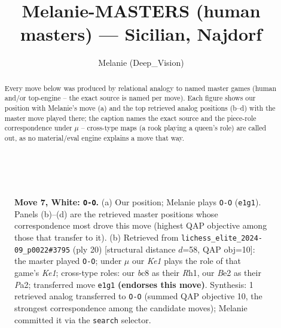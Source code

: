 \documentclass[11pt]{article}
\title{Melanie-MASTERS (human masters) — Sicilian, Najdorf}
\author{Melanie (Deep\_Vision)}
\date{}
\begin{document}
\maketitle

\begin{abstract}Every move below was produced by relational analogy to named master games (human and/or top-engine -- the exact source is named per move). Each figure shows our position with Melanie's move (a) and the top retrieved analog positions (b--d) with the master move played there; the caption names the exact source and the piece-role correspondence under $\mu$ -- cross-type maps (a rook playing a queen's role) are called out, as no material/eval engine explains a move that way.\end{abstract}

\begin{figure}[p]\centering
\begin{subfigure}{0.46\textwidth}\centering
\resizebox{\linewidth}{!}{%
\newchessgame
\chessboard[
  setfen={rnbqkb1r/1p3ppp/p2p1n2/4p3/3NP3/2N5/PPP1BPPP/R1BQK2R w KQkq - 0 7},
  showmover=false,
  pgfstyle=straightmove, color=movearrow, markmove={e1-g1}
]}
\caption{}
\end{subfigure}\hfill
\begin{subfigure}{0.46\textwidth}\centering
\resizebox{\linewidth}{!}{%
\newchessgame
\chessboard[
  setfen={rn1qkb1r/pp3ppp/2p1pn2/5b2/3P1B2/1NN5/PPPQBPPP/R3K2R w KQkq - 0 11},
  showmover=false,
  pgfstyle=straightmove, color=movearrow, markmove={e1-g1}
]}
\caption{}
\end{subfigure}
\\[4pt]

\caption{\textbf{Move 7, White: \texttt{O-O}.} (a) Our position; Melanie plays \texttt{O-O} (\texttt{e1g1}). Panels (b)--(d) are the retrieved master positions whose correspondence most drove this move (highest QAP objective among those that transfer to it). (b) Retrieved from \texttt{lichess\_elite\_2024-09\_p0022\#3795} (ply 20) [structural distance $d$=58, QAP obj=10]: the master played \texttt{O-O}; under $\mu$ our \emph{Ke1} plays the role of that game's \emph{Ke1}; cross-type roles: our \emph{b}c8 as their \emph{R}h1, our \emph{B}e2 as their \emph{P}a2; transferred move \texttt{e1g1} \textbf{(endorses this move)}. Synthesis: 1 retrieved analog transferred to \texttt{O-O} (summed QAP objective 10, the strongest correspondence among the candidate moves); Melanie committed it via the \texttt{search} selector.}
\label{fig:thought-m12}
\end{figure}
\end{document}
